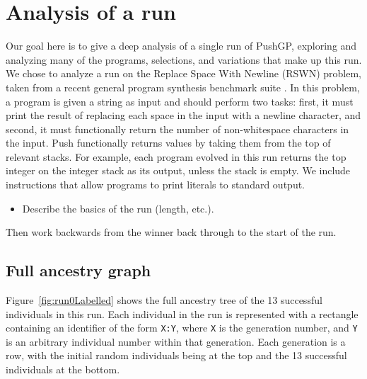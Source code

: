 

\section{Analysis of a run}


Our goal here is to give a deep analysis of a single run of PushGP, exploring and analyzing many of the programs, selections, and variations that make up this run. We chose to analyze a run on the Replace Space With Newline (RSWN) problem, taken from a recent general program synthesis benchmark suite \citep{Helmuth:2015:GECCO}. In this problem, a program is given a string as input and should perform two tasks: first, it must print the result of replacing each space in the input with a newline character, and second, it must functionally return the number of non-whitespace characters in the input. Push functionally returns values by taking them from the top of relevant stacks. For example, each program evolved in this run returns the top integer on the integer stack as its output, unless the stack is empty. We include instructions that allow programs to print literals to standard output.


\begin{itemize}
	\item Describe the basics of the run (length, etc.).
\end{itemize}

Then work backwards from the winner back through to the start of the run.

\subsection{Full ancestry graph}

Figure~\ref{fig:run0Labelled} shows the full ancestry tree of the 13 successful 
individuals in this run. Each individual in the run is represented with a
rectangle containing an identifier of the form \texttt{X:Y}, where \texttt{X}
is the generation number, and \texttt{Y} is an arbitrary individual number
within that generation. Each generation is a row, with the initial random
individuals being at the top and the 13 successful individuals at the bottom.

